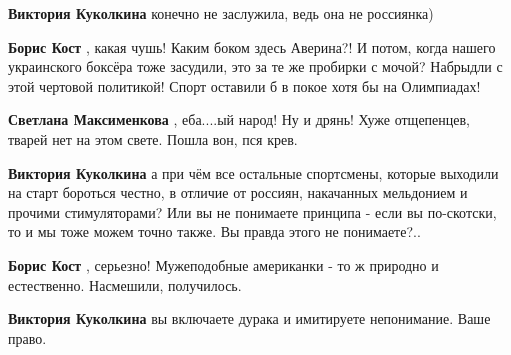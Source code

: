 \begin{itemize}
\begin{itemize}
\textbf{Виктория Куколкина} конечно не заслужила, ведь она не россиянка)

 
\textbf{Борис Кост} , какая чушь! Каким боком здесь Аверина?! И потом, когда нашего украинского боксёра тоже засудили, это за те же пробирки с мочой? Набрыдли с этой чертовой политикой! Спорт оставили б в покое хотя бы на Олимпиадах!

 
\textbf{Светлана Максименкова} , еба....ый народ! Ну и дрянь! Хуже отщепенцев, тварей нет на этом свете. Пошла вон, пся крев.

 
\textbf{Виктория Куколкина} а при чём все остальные спортсмены, которые
выходили на старт бороться честно, в отличие от россиян, накачанных мельдонием
и прочими стимуляторами? Или вы не понимаете принципа - если вы по-скотски, то
и мы тоже можем точно также. Вы правда этого не понимаете?..

 
\textbf{Борис Кост} , серьезно! Мужеподобные американки - то ж природно и естественно. Насмешили, получилось.

 
\textbf{Виктория Куколкина} вы включаете дурака и имитируете непонимание. Ваше право.


\end{itemize}
\end{itemize}
